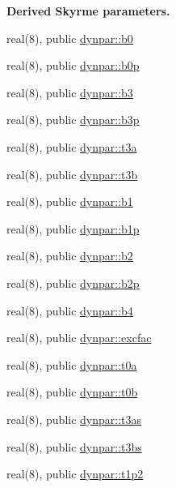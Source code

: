 \begin{Indent}{\bf Derived Skyrme parameters.}\par
\begin{DoxyCompactItemize}
\item 
real(8), public \hyperlink{namespacedynpar_a53ab5951e0b2309de0b70a1c4ed03b07}{dynpar\+::b0}
\item 
real(8), public \hyperlink{namespacedynpar_a379a8175aa37f44759f2b62bd27a76e0}{dynpar\+::b0p}
\item 
real(8), public \hyperlink{namespacedynpar_a811a42f35301cbdb8ee37c6fdf56558c}{dynpar\+::b3}
\item 
real(8), public \hyperlink{namespacedynpar_af78f594b9c951af8dc91b124d192df5c}{dynpar\+::b3p}
\item 
real(8), public \hyperlink{namespacedynpar_ae4ae725b9d947daf64381a8f6e548950}{dynpar\+::t3a}
\item 
real(8), public \hyperlink{namespacedynpar_af38239c24afd2676313e0c0a8c870081}{dynpar\+::t3b}
\item 
real(8), public \hyperlink{namespacedynpar_aa95922396181850004ed652d9f5e3259}{dynpar\+::b1}
\item 
real(8), public \hyperlink{namespacedynpar_a347f996a3226e7599806a449764a02aa}{dynpar\+::b1p}
\item 
real(8), public \hyperlink{namespacedynpar_a6d8257ffb2114f236aac765b449e88d1}{dynpar\+::b2}
\item 
real(8), public \hyperlink{namespacedynpar_a40942636c4d9f3131cc03ba0689344b3}{dynpar\+::b2p}
\item 
real(8), public \hyperlink{namespacedynpar_a8f23cf4ba8078bb7640333e262d54d50}{dynpar\+::b4}
\item 
real(8), public \hyperlink{namespacedynpar_a103907f87cc49eb26fa37bbe3b7bc949}{dynpar\+::excfac}
\item 
real(8), public \hyperlink{namespacedynpar_a681cb5c9252ca4a841129d53e48dd8fc}{dynpar\+::t0a}
\item 
real(8), public \hyperlink{namespacedynpar_a91a3c596507a193726e3767b0b42e939}{dynpar\+::t0b}
\item 
real(8), public \hyperlink{namespacedynpar_afd89ca189016c6d6a5ae17df11a807a6}{dynpar\+::t3as}
\item 
real(8), public \hyperlink{namespacedynpar_a11da6c261b7534cd869677b64ee925bc}{dynpar\+::t3bs}
\item 
real(8), public \hyperlink{namespacedynpar_a7e24ee9b9f9dbbeb5f12c85c35eb606f}{dynpar\+::t1p2}
\item 

\end{DoxyCompactItemize}
\end{Indent}
